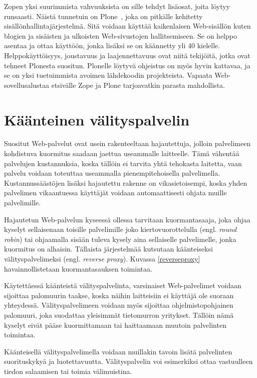 Zopen yksi suurimmista vahvuuksista on sille tehdyt lisäosat, joita löytyy runsaasti. Näistä tunnetuin on Plone~\cite{Plone}, joka on pitkälle kehitetty 
sisällönhallintajärjestelmä. Sitä voidaan käyttää kaikenlaisen Web-sisällön kuten blogien ja sisäisten ja ulkoisten Web-sivustojen hallitsemiseen. Se on helppo asentaa ja ottaa käyttöön, 
jonka lisäksi se on käännetty yli 40 kielelle. Helppokäyttöisyys, joustavuus ja laajennettavuus ovat niitä tekijöitä, jotka ovat tehneet Plonesta suositun. Plonelle löytyvä ohjeistus
on myös hyvin kattavaa, ja se on yksi tuetuimmista avoimen lähdekoodin projekteista. Vapaata Web-sovellusalustaa etsivälle Zope ja Plone tarjoavatkin parasta mahdollista.

\section{Käänteinen välityspalvelin}
\label{valimuisti}

Suositut Web-palvelut ovat usein rakenteeltaan hajautettuja, jolloin
palvelimeen kohdistuva kuormitus saadaan jaettua useammalle
laitteelle. Tämä vähentää palvelujen kustannuksia, koska tällöin ei
tarvita yhtä tehokasta laitetta, vaan palvelu voidaan toteuttaa
useammalla pienempitehoisella palvelimella. Kustannussäästöjen lisäksi
hajautettu rakenne on vikasietoisempi, koska yhden palvelimen
vikaantuessa käyttäjät voidaan automaattisesti ohjata muille
palvelimille.

Hajautetun Web-palvelun kyseessä ollessa tarvitaan kuormantasaaja,
joka ohjaa kyselyt sellaisenaan toisille palvelimille joko
kiertovuorottelulla (engl. \textit{round robin}) tai ohjaamalla sisään
tuleva kysely aina sellaiselle palvelimelle, jonka kuormitus on
alhaisin. Tällaista järjestelmää kutsutaan käänteiseksi
välityspalvelimeksi (engl. \textit{reverse proxy}). Kuvassa
\ref{reverseproxy} havainnollistetaan kuormantasauksen toimintaa.

Käytettäessä käänteistä välityspalvelinta, varsinaiset
Web-palvelimet voidaan sijoittaa palomuurin taakse, koska näihin laitteisiin
ei käyttäjä ole suoraan yhteydessä. Välityspalvelimeen voidaan myös
sijoittaa ohjelmistopohjainen palomuuri, joka suodattaa yleisimmät
tietomurron yritykset. Tällöin nämä kyselyt eivät pääse
kuormittamaan tai haittaamaan muutoin palvelinten toimintaa.

Käänteisellä välityspalvelimella voidaan muillakin tavoin lisätä
palvelinten suorituskykyä ja luotettavuutta. Välityspalvelin voi
esimerkiksi ottaa vastuulleen tiedon salaamisen tai toimia
välimuistina.


